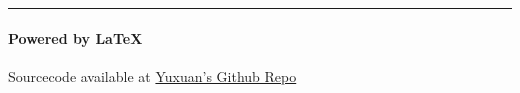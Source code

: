 




    

    

    

    

    \vfill
    \noindent\rule{\textwidth}{0.1pt}
    \vspace{-30pt}
    \paragraph*{Powered by \LaTeX}
    \hfill Sourcecode available at \href{https://github.com/zhangyx1998/Courses_FALL2019}{Yuxuan's Github Repo}

